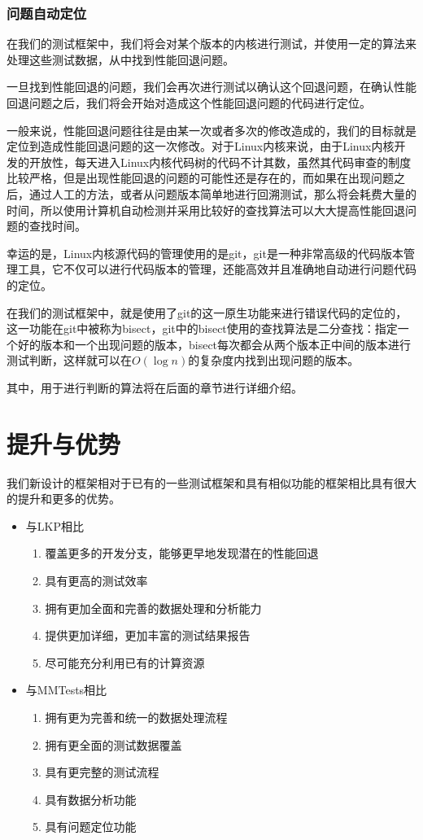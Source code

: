 \subsubsection{问题自动定位}
在我们的测试框架中，我们将会对某个版本的内核进行测试，并使用一定的算法来处理这些测试数据，从中找到性能回退问题。

一旦找到性能回退的问题，我们会再次进行测试以确认这个回退问题，在确认性能回退问题之后，我们将会开始对造成这个性能回退问题的代码进行定位。

一般来说，性能回退问题往往是由某一次或者多次的修改造成的，我们的目标就是定位到造成性能回退问题的这一次修改。对于Linux内核来说，由于Linux内核开发的开放性，每天进入Linux内核代码树的代码不计其数，虽然其代码审查的制度比较严格，但是出现性能回退的问题的可能性还是存在的，而如果在出现问题之后，通过人工的方法，或者从问题版本简单地进行回溯测试，那么将会耗费大量的时间，所以使用计算机自动检测并采用比较好的查找算法可以大大提高性能回退问题的查找时间。

幸运的是，Linux内核源代码的管理使用的是git，git是一种非常高级的代码版本管理工具，它不仅可以进行代码版本的管理，还能高效并且准确地自动进行问题代码的定位。

在我们的测试框架中，就是使用了git的这一原生功能来进行错误代码的定位的，这一功能在git中被称为bisect，git中的bisect使用的查找算法是二分查找：指定一个好的版本和一个出现问题的版本，bisect每次都会从两个版本正中间的版本进行测试判断，这样就可以在$O(\log{n})$的复杂度内找到出现问题的版本。

其中，用于进行判断的算法将在后面的章节进行详细介绍。


\section{提升与优势}

我们新设计的框架相对于已有的一些测试框架和具有相似功能的框架相比具有很大的提升和更多的优势。

\begin{itemize}
\item 与LKP相比

\begin{enumerate}
\item 覆盖更多的开发分支，能够更早地发现潜在的性能回退
\item 具有更高的测试效率
\item 拥有更加全面和完善的数据处理和分析能力
\item 提供更加详细，更加丰富的测试结果报告
\item 尽可能充分利用已有的计算资源
\end{enumerate}

\item 与MMTests相比

\begin{enumerate}
\item 拥有更为完善和统一的数据处理流程
\item 拥有更全面的测试数据覆盖
\item 具有更完整的测试流程
\item 具有数据分析功能
\item 具有问题定位功能
\end{enumerate}

\end{itemize}